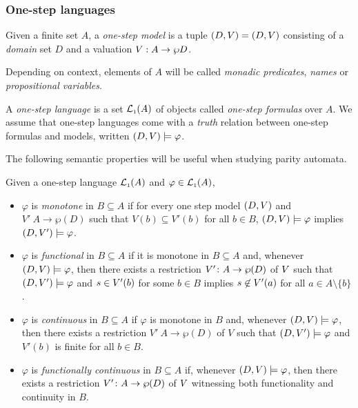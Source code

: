 

\subsubsection{One-step languages}

\begin{definition}
Given a finite set $A$, a \emph{one-step model} is a tuple $(D, V) = (D,V)$
consisting of a \emph{domain} set $D$ and a valuation $V: A \to \wp D$.

Depending on context, elements of $A$ will be called \emph{monadic predicates}, \emph{names}
or \emph{propositional variables}.

A \emph{one-step language} is a set $\mathcal{L}_{\scriptscriptstyle 1}(A)$ of objects called \emph{one-step formulas} over $A$. We assume that one-step languages come with a \emph{truth} relation between one-step formulas and models, written $(D, V) \models \varphi$.
\end{definition}

The following semantic properties will be useful when studying parity automata.

\begin{definition}\label{def:functionalsentenceofoe} Given a one-step language $\mathcal{L}_{\scriptscriptstyle 1}(A)$ and $\varphi \in \mathcal{L}_{\scriptscriptstyle 1}(A)$,
\begin{itemize}
\item $\varphi$ is \emph{monotone} in $B \subseteq A$ if for every one step model $(D,V)$ and $V' \: A \to \wp(D)$ such that $V(b) \subseteq V'(b)$ for all $b \in B$, $(D,V) \models \varphi$ implies $(D,V') \models \varphi$.
\item $\varphi$ is \emph{functional} in $B\subseteq A$ if it is monotone in $B \subseteq A$ and, whenever $(D,V) \models \varphi$, then there exists a restriction $V' \colon A \to \wp(D)$ of $V$ such that $(D,V') \models \varphi$ and $s \in V'(b)$ for some $b \in B$ implies $s \not\in V'(a)$ for all $a \in A\setminus\{b\}$.
\item $\varphi$ is \emph{continuous} in $B \subseteq A$ if $\varphi$ is monotone in $B$ and, whenever $(D,V) \models \varphi$, then there exists a restriction $V' \: A \to \wp(D)$ of $V$ such that $(D,V') \models \varphi$ and $V'(b)$ is finite for all $b \in B$.
\item $\varphi$ is \emph{functionally continuous} in $B \subseteq A$ if, whenever $(D,V) \models \varphi$, then there exists a restriction $V' \colon A \to \wp(D)$ of $V$ witnessing both functionality and continuity in $B$.
\end{itemize}
\end{definition}


